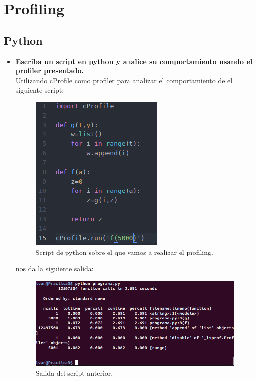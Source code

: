 \section{Profiling}
	\subsection{Python}
	\begin{itemize}
		\item \textbf{Escriba un script en python y analice su comportamiento usando el profiler presentado.}\\
		Utilizando cProfile\cite{python} como profiler para analizar el comportamiento de el siguiente script:\\
		\begin{figure}[H]
		\centering
		\includegraphics[width=0.4\linewidth]{pythonProgram}
		\caption[Script en python]{Script de python sobre el que vamos a realizar el profiling.}
		\label{fig:pythonProgram}
		\end{figure}
		
		nos da la siguiente salida:\\
		
		\begin{figure}[H]
		\centering
		\includegraphics[width=0.8\linewidth]{python_profiling}
		\caption[profiling python]{Salida del script anterior.}
		\label{fig:python_profiling}
		\end{figure}
		

\end{itemize}
